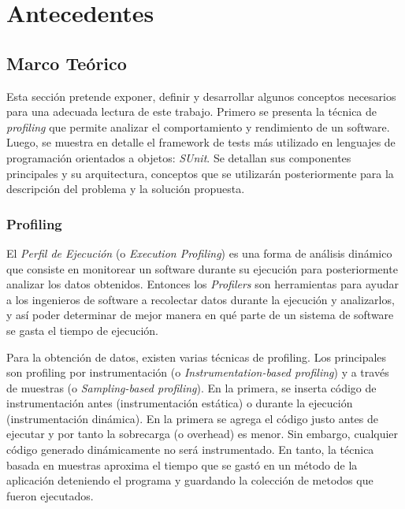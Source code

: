 \chapter{Antecedentes}


\section{Marco Teórico}

\par Esta sección pretende exponer, definir y desarrollar algunos conceptos necesarios para una adecuada lectura de este trabajo. Primero se presenta la técnica de \emph{profiling} que permite analizar el comportamiento y rendimiento de un software. Luego, se muestra en detalle el framework de tests más utilizado en lenguajes de programación orientados a objetos:  \mbox{\emph{SUnit}}. Se detallan sus componentes principales y su arquitectura, conceptos que se utilizarán posteriormente para la descripción del problema y la solución propuesta.

\subsection{Profiling}

\par El \emph{Perfil de Ejecución} (o \emph{Execution Profiling}) es una forma de análisis dinámico que consiste en monitorear un software durante su ejecución para posteriormente analizar los datos obtenidos. Entonces los \emph{Profilers} son herramientas para ayudar a los ingenieros de software a recolectar datos durante la ejecución y analizarlos, y así poder determinar de mejor manera en qué parte de un sistema de software se gasta el tiempo de ejecución.


\par Para la obtención de datos, existen varias técnicas de profiling. Los principales son profiling por instrumentación (o \emph{Instrumentation-based profiling}) y a través de muestras (o \emph{Sampling-based profiling}). En la primera, se inserta código de instrumentación antes (instrumentación estática) o durante la ejecución (instrumentación dinámica). En la primera se agrega el código justo antes de ejecutar y por tanto la sobrecarga (o overhead) es menor. Sin embargo, cualquier código generado dinámicamente no será instrumentado. En tanto, la técnica basada en muestras aproxima el tiempo que se gastó en un método de la aplicación deteniendo el programa y guardando la colección de metodos que fueron ejecutados.

